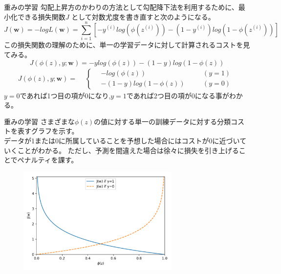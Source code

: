 \documentclass[aspectratio=169, dvipdfmx, 11pt]{beamer} %
\begin{document}
\begin{frame}{重みの学習}
    勾配上昇方のかわりの方法として勾配降下法を利用するために、最小化できる損失関数\(J\)
    として対数尤度を書き直すと次のようになる。
    \begin{equation*}
        J(\textbf{w}) = -logL(\textbf{w})
        = \sum_{i=1}^{n} [-y^{(i)} log(\phi (z^{(i)})) - (1-y^{(i)})log(1-\phi (z^{(i)}))]
    \end{equation*}
    この損失関数の理解のために、単一の学習データに対して計算されるコストを見てみる。
    \begin{equation*}
        J(\phi (z), y;\textbf{w}) = -y log(\phi (z)) - (1-y)log(1-\phi (z))
    \end{equation*}
    \begin{equation*}
        J(\phi (z), y;\textbf{w}) = 
        \begin{aligned}
            & \left\{ \,
                \begin{aligned}
                    & - log(\phi (z)) & \quad &(y=1) \\
                    & - (1-y)log(1-\phi (z)) & \quad &(y=0)
                \end{aligned}
            \right.
        \end{aligned}
    \end{equation*}
    \(y=0\)であれば1つ目の項が0になり,\(y=1\)であれば2つ目の項が0になる事がわかる。
\end{frame}

\begin{frame}{重みの学習}
    さまざまな\(\phi(z)\)の値に対する単一の訓練データに対する分類コストを表すグラフを示す。\\
    データが1または0に所属していることを予想した場合にはコストが0に近づいていくことがわかる。
    ただし、予測を間違えた場合は徐々に損失を引き上げることでペナルティを課す。
    \begin{figure}[b]
        \begin{center}
        \includegraphics[width=80mm]{img/day02/fig04.png}
        \end{center}
    \end{figure}
\end{frame}
\end{document}
